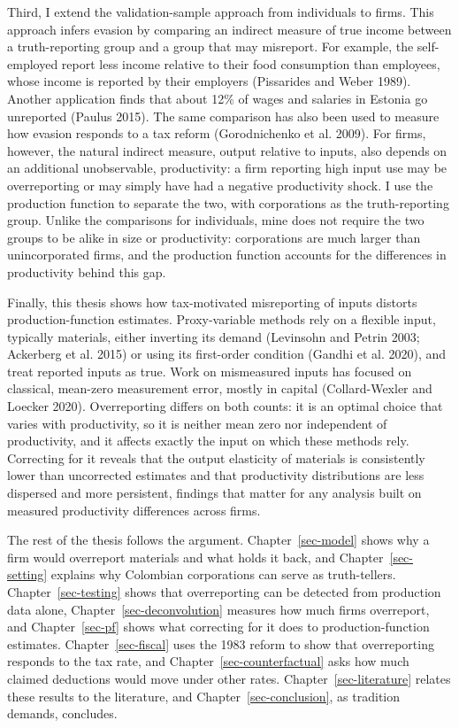 \documentclass[
  12pt,
  letterpaper,
  oneside,
  openany]{report}
\begin{document}
Third, I extend the validation-sample approach from individuals to
firms. This approach infers evasion by comparing an indirect measure of
true income between a truth-reporting group and a group that may
misreport. For example, the self-employed report less income relative to
their food consumption than employees, whose income is reported by their
employers (Pissarides and Weber 1989). Another application finds that
about 12\% of wages and salaries in Estonia go unreported (Paulus 2015).
The same comparison has also been used to measure how evasion responds
to a tax reform (Gorodnichenko et al. 2009). For firms, however, the
natural indirect measure, output relative to inputs, also depends on an
additional unobservable, productivity: a firm reporting high input use
may be overreporting or may simply have had a negative productivity
shock. I use the production function to separate the two, with
corporations as the truth-reporting group. Unlike the comparisons for
individuals, mine does not require the two groups to be alike in size or
productivity: corporations are much larger than unincorporated firms,
and the production function accounts for the differences in productivity
behind this gap.

Finally, this thesis shows how tax-motivated misreporting of inputs
distorts production-function estimates. Proxy-variable methods rely on a
flexible input, typically materials, either inverting its demand
(Levinsohn and Petrin 2003; Ackerberg et al. 2015) or using its
first-order condition (Gandhi et al. 2020), and treat reported inputs as
true. Work on mismeasured inputs has focused on classical, mean-zero
measurement error, mostly in capital (Collard-Wexler and Loecker 2020).
Overreporting differs on both counts: it is an optimal choice that
varies with productivity, so it is neither mean zero nor independent of
productivity, and it affects exactly the input on which these methods
rely. Correcting for it reveals that the output elasticity of materials
is consistently lower than uncorrected estimates and that productivity
distributions are less dispersed and more persistent, findings that
matter for any analysis built on measured productivity differences
across firms.

The rest of the thesis follows the argument. Chapter~\ref{sec-model}
shows why a firm would overreport materials and what holds it back, and
Chapter~\ref{sec-setting} explains why Colombian corporations can serve
as truth-tellers. Chapter~\ref{sec-testing} shows that overreporting can
be detected from production data alone, Chapter~\ref{sec-deconvolution}
measures how much firms overreport, and Chapter~\ref{sec-pf} shows what
correcting for it does to production-function estimates.
Chapter~\ref{sec-fiscal} uses the 1983 reform to show that overreporting
responds to the tax rate, and Chapter~\ref{sec-counterfactual} asks how
much claimed deductions would move under other rates.
Chapter~\ref{sec-literature} relates these results to the literature,
and Chapter~\ref{sec-conclusion}, as tradition demands, concludes.
\end{document}
